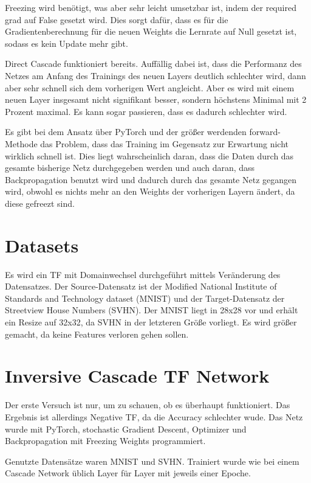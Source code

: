     Freezing wird benötigt, was aber sehr leicht umsetzbar ist, indem 
    der required grad auf False gesetzt wird. Dies sorgt dafür, dass 
    es für die Gradientenberechnung für die neuen Weights die Lernrate 
    auf Null gesetzt ist, sodass es kein Update mehr gibt.

    Direct Cascade funktioniert bereits. Auffällig dabei ist, dass 
    die Performanz des Netzes am Anfang des Trainings des neuen Layers 
    deutlich schlechter wird, dann aber sehr schnell sich dem vorherigen 
    Wert angleicht. Aber es wird mit einem neuen Layer insgesamt nicht 
    signifikant besser, sondern höchstens Minimal mit 2 Prozent maximal. 
    Es kann sogar passieren, dass es dadurch schlechter wird.

    Es gibt bei dem Ansatz über PyTorch und der größer werdenden forward-Methode 
    das Problem, dass das Training im Gegensatz zur Erwartung nicht wirklich 
    schnell ist. Dies liegt wahrscheinlich daran, dass die Daten durch das gesamte 
    bisherige Netz durchgegeben werden und auch daran, dass Backpropagation 
    benutzt wird und dadurch durch das gesamte Netz gegangen wird, obwohl es 
    nichts mehr an den Weights der vorherigen Layern ändert, da diese gefreezt 
    sind. 

\section{Datasets}

    Es wird ein TF mit Domainwechsel durchgeführt mittels Veränderung des 
    Datensatzes. Der Source-Datensatz ist der Modified National Institute 
    of Standards and Technology dataset (MNIST) und der Target-Datensatz 
    der Streetview House Numbers (SVHN). Der MNIST liegt in 28x28 vor und 
    erhält ein Resize auf 32x32, da SVHN in der letzteren Größe vorliegt. 
    Es wird größer gemacht, da keine Features verloren gehen sollen.

\section{Inversive Cascade TF Network}

    Der erste Versuch ist nur, um zu schauen, ob es überhaupt funktioniert. 
    Das Ergebnis ist allerdings Negative TF, da die Accuracy schlechter wude. 
    Das Netz wurde mit PyTorch, stochastic Gradient Descent, Optimizer und 
    Backpropagation mit Freezing Weights programmiert. 

    Genutzte Datensätze waren MNIST und SVHN. Trainiert wurde wie bei einem 
    Cascade Network üblich Layer für Layer mit jeweils einer Epoche.

